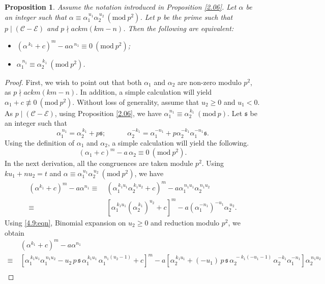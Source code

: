 \documentclass[table]{amsart}
\newcommand{\Mod}[1]{\ (\mathrm{mod}\ #1)} %
\newcommand{\sfrak}{\mathfrak{s}}
\newtheorem{proposition}[theorem]{Proposition}
\renewcommand{\a}{\alpha}
\newcommand{\calC}{\mathcal{C}}
\newcommand{\calE}{\mathcal{E}}
\numberwithin{equation}{section}
\begin{document}
\begin{proposition} \label{4.4:prop}
    Assume the notation introduced in Proposition \ref{2.06}. Let $\a$ be an integer such that $\a \equiv \a_1^{\,u_1}\a_2^{\,u_2} \Mod{p^2}$. Let $p$ be the prime such that $p \mid (\calC - \calE)$ and $p \nmid ackm(km-n)$. Then the following are equivalent:
    \begin{itemize}
        \item[\textup{(i)}] $(\alpha^{\,k_1} + c)^m - a \alpha^{\,n_1} \equiv 0 \Mod{p^2}$;
        \item[\textup{(ii)}] $\alpha_1^{\,n_1} \equiv \alpha_2^{\,k_1} \Mod{p^2}$.
    \end{itemize}
\end{proposition}
\begin{proof}
    First, we wish to point out that both $\a_1$ and $\a_2$ are non-zero modulo $p^2$, as $p \nmid ackm(km-n)$. In addition, a simple calculation will yield $\a_1 + c \not\equiv 0 \Mod{p^2}$. Without loss of generality, assume that $u_2 \geq 0$ and $u_1 < 0$. As $p \mid (\calC-\calE)$, using Proposition \ref{2.06}, we have $\alpha_1^{\,n_1} \equiv \alpha_2^{\,k_1} \Mod{p}$. Let $\sfrak$ be an integer such that
    \begin{equation} \label{4.9:eqn}
        \a_1^{\,n_1} = \a_2^{\,k_1} + p\sfrak; \quad \quad \quad
        \a_2^{-k_1} = \a_1^{-n_1} + p\a_2^{-k_1}\a_1^{-n_1} \sfrak. 
    \end{equation}
    Using the definition of $\a_1$ and $\a_2$, a simple calculation will yield the following.
    \begin{equation} \label{4.10:eqn}
        (\a_1+c)^m - a \,\a_2 \equiv 0 \Mod{p^2}.
    \end{equation}
    In the next derivation, all the congruences are taken module $p^2$. Using $ku_1 + nu_2 = t$ and $\a \equiv \a_1^{\,u_1}\a_2^{\,u_2} \Mod{p^2}$, we have
    \begin{align*}
        (\a^{k_1} + c)^m - a \a^{n_1} 
        \equiv~ &(\a_1^{\,k_1u_1}\a_2^{\,k_1u_2} +c)^m - a \a_1^{\,n_1u_1}\a_2^{\,n_1u_2} \\
        \equiv~ &[ \a_1^{\,k_1u_1}(\a_2^{\,k_1})^{u_2} + c]^m - a (\a_1^{-n_1})^{-u_1}\a_2^{\,u_2}.
    \end{align*}
    Using \eqref{4.9:eqn}, Binomial expansion on $u_2\geq 0$ and reduction modulo $p^2$, we obtain
    \begin{align*}
        &(\a^{k_1} + c)^m - a \a^{n_1} \\
        \equiv~ &\left[ \a_1^{\,k_1u_1}\a_1^{\,n_1u_2} - u_2 \,p \,\sfrak \,\a_1^{\,k_1u_1}\,\a_1^{\,n_1(u_2-1)} + c\right]^m - a \left[ \a_2^{\,k_1u_1} + (-u_1)\, p\, \sfrak\, \a_2^{\,-k_1(-u_1-1)}\, \a_2^{-k_1} \a_1^{-n_1} \right] \a_2^{\,n_1u_2} \\

\end{align*}
\end{proof}
\end{document}
